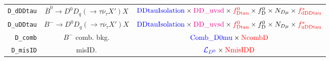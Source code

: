 \begin{landscape}
\begin{table}
\begin{tabular}{r|c|c}
       \texttt{D\_dDDtau} &   $\overline{B}^0 \rightarrow D^0 D_q (\rightarrow \tau \overline{\nu}_\tau X') X$   &                                                                                    $\textcolor{blue}{\text{DDtauIsolation}} \times \textcolor{magenta}{\text{DD\_uvsd}} \times \textcolor{red}{f^{0}_\text{Dtau}} \times f^{0}_\text{D} \times N_{D \mu} \times \textcolor{red}{f^{*}_\text{dDDtau}}$                                                                                    \\
       \texttt{D\_uDDtau} &        $B^- \rightarrow D^0 D_q (\rightarrow \tau \overline{\nu}_\tau X') X$         &                                                                                    $\textcolor{blue}{\text{DDtauIsolation}} \times \textcolor{magenta}{\text{DD\_uvsd}} \times \textcolor{red}{f^{0}_\text{Dtau}} \times f^{0}_\text{D} \times N_{D \mu} \times \textcolor{red}{f^{*}_\text{uDDtau}}$                                                                                    \\
         \texttt{D\_comb} &                                   $B^-$ comb. bkg.                                   &                                                                                                                                                       $\textcolor{blue}{\text{Comb\_D0mu}} \times \textcolor{red}{\text{NcombD}}$                                                                                                                                                        \\
        \texttt{D\_misID} &                                        misID.                                        &                                                                                                                                                       $\textcolor{blue}{\mathcal{L}_{D^0}} \times \textcolor{red}{\text{NmisIDD}}$                                                                                                                                                       \\
\bottomrule
\end{tabular}

\end{table}
\end{landscape}
\restoregeometry


